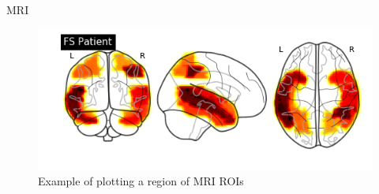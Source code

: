 \documentclass[final]{beamer}
\newlength{\onecolwid}
\newlength{\twocolwid}
\begin{document}
\begin{frame}[t]
\begin{columns}[t]
\begin{column}{\twocolwid}
        





    \begin{columns}[t,totalwidth=\twocolwid] %
    
        \begin{column}{\onecolwid} %
        
            
            \begin{block}{MRI}
                    
            
            \begin{figure}
                    \includegraphics[width=1.0\linewidth]{images/exampleROI.png}
                    \caption{Example of plotting a region of MRI ROIs}
            \end{figure}\
         

\end{block}
\end{column}
\end{columns}
\end{column}
\end{columns}
\end{frame}
\end{document}
